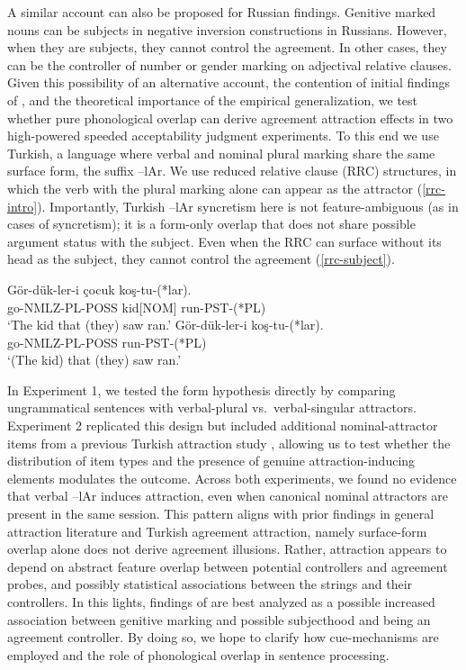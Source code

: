 \documentclass[
  authoryear,
  3p]{elsarticle}
\begin{document}
A similar account can also be proposed for Russian findings. Genitive
marked nouns can be subjects in negative inversion constructions in
Russians. However, when they are subjects, they cannot control the
agreement. In other cases, they can be the controller of number or
gender marking on adjectival relative clauses. Given this possibility of
an alternative account, the contention of initial findings of
\citet{BockEberhard1993}, and the theoretical importance of the
empirical generalization, we test whether pure phonological overlap can
derive agreement attraction effects in two high-powered speeded
acceptability judgment experiments. To this end we use Turkish, a
language where verbal and nominal plural marking share the same surface
form, the suffix --lAr. We use reduced relative clause (RRC) structures,
in which the verb with the plural marking alone can appear as the
attractor (\ref{rrc-intro}). Importantly, Turkish --lAr syncretism here
is not feature-ambiguous (as in cases of syncretism); it is a form-only
overlap that does not share possible argument status with the subject.
Even when the RRC can surface without its head as the subject, they
cannot control the agreement (\ref{rrc-subject}).

\begin{exe}
\ex \label{rrc-intro}
\gll Gör-dük-ler-i çocuk koş-tu-(*lar).\\
go-NMLZ-PL-POSS kid[NOM] run-PST-(*PL)\\
\glt `The kid that (they) saw ran.'
\ex \label{rrc-subject}
\gll Gör-dük-ler-i koş-tu-(*lar).\\
go-NMLZ-PL-POSS run-PST-(*PL)\\
\glt `(The kid) that (they) saw ran.'
\end{exe}

In Experiment 1, we tested the form hypothesis directly by comparing
ungrammatical sentences with verbal-plural vs.~verbal-singular
attractors. Experiment 2 replicated this design but included additional
nominal-attractor items from a previous Turkish attraction study
\citep{TurkLogacev2024}, allowing us to test whether the distribution of
item types and the presence of genuine attraction-inducing elements
modulates the outcome. Across both experiments, we found no evidence
that verbal --lAr induces attraction, even when canonical nominal
attractors are present in the same session. This pattern aligns with
prior findings in general attraction literature and Turkish agreement
attraction, namely surface-form overlap alone does not derive agreement
illusions. Rather, attraction appears to depend on abstract feature
overlap between potential controllers and agreement probes, and possibly
statistical associations between the strings and their controllers. In
this lights, findings of \citet{Slioussar2018} are best analyzed as a
possible increased association between genitive marking and possible
subjecthood and being an agreement controller. By doing so, we hope to
clarify how cue-mechanisms are employed and the role of phonological
overlap in sentence processing.
\end{document}
